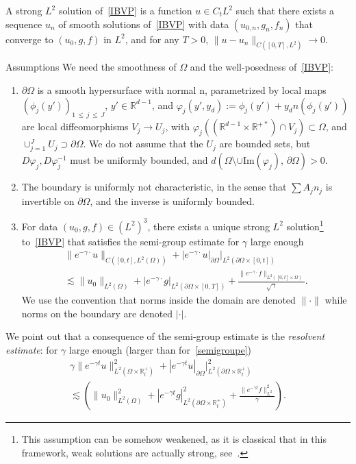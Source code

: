 \documentclass[10pt]{amsart}
\theoremstyle{definition}\newtheorem{defi}[theo]{Definition}\newtheorem{rema}[theo]{Remark}\newtheorem{exam}[theo]{Example}\newtheorem{exem}[theo]{Example}\newtheorem{nota}[theo]{Notation}
\newcommand{\R}{\mathbb{R}}
\newcommand{\rmn}{\mathrm{n}}
\renewcommand{\Im}{\mathrm{Im}}
\begin{document}
A strong $L^2$ solution of~\eqref{IBVP} is a function $u\in C_tL^2$ such that there exists a sequence $u_n$ of smooth solutions of~\eqref{IBVP} with data $(u_{0,n},g_n,f_n)$ that converge to $(u_{0},g,f)$ in $L^2$, and for any $T>0$, $\|u-u_n\| _{C([0,T],L^2)}\to 0$.

\begin{enonce}{Assumptions}
We need the smoothness of $\Omega$ and the well-posedness of~\eqref{IBVP}:
\begin{enumerate}
\item \label{assump1}
$\partial\Omega$ is a smooth hypersurface with normal $\rmn$, parametrized by local maps $(\phi_j(y'))_{1\,\leq\,j\,\leq \,J}$, $y'\in \R^{d-1}$, and $\varphi_j(y',y_d):=\phi_j(y')+y_d n(\phi_j(y'))$ are local diffeomorphisms $V_j\to U_j$, with $\varphi_j ((\R^{d-1}\times \R^{+*})\cap V_j) \subset
\Omega$, and $\cup_{j=1}^JU_j\supset \partial\Omega$. We do not assume that the $U_j$ are bounded sets, but $D\varphi_j,D\varphi_j^{-1}$ must be uniformly bounded, and $d(\Omega\setminus
\cup \Im(\varphi_j),\,
\partial\Omega)>0$.
\item \label{charac}
The boundary is uniformly not characteristic, in the sense that $\sum A_jn_j$ is invertible on $\partial\Omega$, and the inverse is uniformly bounded.
\item For data $(u_0,g,f)\in (L^2)^3$, there exists a unique strong $L^2$ solution\footnote{This assumption can be somehow weakened, as it is classical that in this framework, weak solutions are actually strong, see~\cite{LaxPhillips}.} to~\eqref{IBVP} that satisfies the semi-group estimate for $\gamma$ large enough
\begin{multline}\label{semigroupe}
\|e^{-\gamma \cdot}u\|_{C([0,t],L^2(\Omega))}+ |e^{-\gamma \cdot}u|_{\partial\Omega}|_{L^2(\partial\Omega\times [0,t])}\\
\lesssim \|u_0\|_{L^2(\Omega)}+ |e^{-\gamma \cdot }g|_{L^2(\partial\Omega\times [0,T])}
+\frac{\|e^{-\gamma \cdot}f\|_{L^2 ([0,t]\times \Omega)}}{\sqrt{\gamma}}.
\end{multline}
We use the convention that norms inside the domain are denoted $\|\cdot\|$ while norms on the boundary are denoted $|\cdot|$.
\end{enumerate}
\end{enonce}
We point out that a consequence of the semi-group estimate is the \emph{resolvent estimate}: for $\gamma$ large enough (larger than for~\eqref{semigroupe})
\begin{multline}\label{resolv}
\gamma \|e^{-\gamma t}u\|_{L^2(\Omega\times \R_t^+)}^2 +|e^{-\gamma t}u|_{\partial\Omega}|_{L^2(\partial\Omega\times \R_t^+)}^2
\\
\lesssim \left(\|u_0\|_{L^2(\Omega)}^2+ |e^{-\gamma t}g|_{L^2(\partial\Omega\times \R_t^+)}^2+\frac{
\|e^{-\gamma t}f\|_{L^2}^2}{\gamma}\right).
\end{multline}
\end{document}
